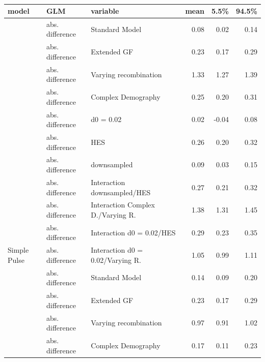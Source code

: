 \documentclass[11pt]{article}
\begin{document}
\begin{table}[H]

\caption{\label{tab:table_Supplements_GLM_EP_SP_tm_effect_size_deviation} }

\centering

\begin{tabular}[t]{l|l|l|r|r|r}
\hline
model & GLM & variable & mean & 5.5\% & 94.5\%\\
\hline
 & abs. difference & Standard Model & 0.08 & 0.02 & 0.14\\

 & abs. difference & Extended GF & 0.23 & 0.17 & 0.29\\

 & abs. difference & Varying recombination & 1.33 & 1.27 & 1.39\\

 & abs. difference & Complex Demography & 0.25 & 0.20 & 0.31\\

 & abs. difference & d0 = 0.02 & 0.02 & -0.04 & 0.08\\

 & abs. difference & HES & 0.26 & 0.20 & 0.32\\

 & abs. difference & downsampled & 0.09 & 0.03 & 0.15\\

 & abs. difference & Interaction downsampled/HES & 0.27 & 0.21 & 0.32\\

 & abs. difference & Interaction Complex D./Varying R. & 1.38 & 1.31 & 1.45\\

 & abs. difference & Interaction d0 = 0.02/HES & 0.29 & 0.23 & 0.35\\

\multirow{-11}{*}{\raggedright\arraybackslash Simple Pulse} & abs. difference & Interaction d0 = 0.02/Varying R. & 1.05 & 0.99 & 1.11\\
\cline{1-6}
 & abs. difference & Standard Model & 0.14 & 0.09 & 0.20\\

 & abs. difference & Extended GF & 0.23 & 0.17 & 0.29\\

 & abs. difference & Varying recombination & 0.97 & 0.91 & 1.02\\

 & abs. difference & Complex Demography & 0.17 & 0.11 & 0.23\\


\end{tabular}
\end{table}
\end{document}
